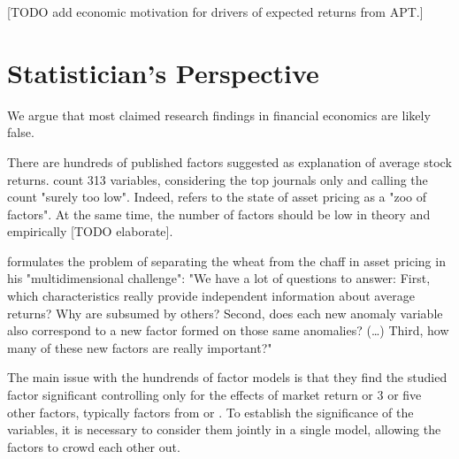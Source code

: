 			[TODO add economic motivation for drivers of expected returns from APT.]
	
	\section{Statistician's Perspective} 
		
		\epigraph{We argue that most claimed research findings in financial economics are likely false. }{\cite{harvey2016and}}
		
		There are hundreds of published factors suggested as explanation of average stock returns. \cite{harvey2016and} count 313 variables, considering the top journals only and calling the count "surely too low". Indeed, \cite{cochrane2011presidential} refers to the state of asset pricing as a "zoo of factors". At the same time, 
		the number of factors should be low in theory \citep{cochrane2011presidential} and empirically \citep{ahn2012determining} [TODO elaborate].
		
		\cite[p.~1060]{cochrane2011presidential} formulates the problem of separating the wheat from the chaff in asset pricing in his "multidimensional challenge": "We have a lot of questions to answer: First, which characteristics really provide independent information about average returns? Why are subsumed by others? Second, does each new anomaly variable also correspond to a new factor formed on those same anomalies? (\ldots) Third, how many of these new factors are really important?"
		
		The main issue with the hundrends of factor models is that they find the studied factor significant controlling only for the effects of market return or 3 or five other factors, typically factors from  \cite{fama1996multifactor} or \cite{fama2015five}. To establish the significance of the variables, it is necessary to consider them jointly in a single model, allowing the factors to crowd each other out. 
		
